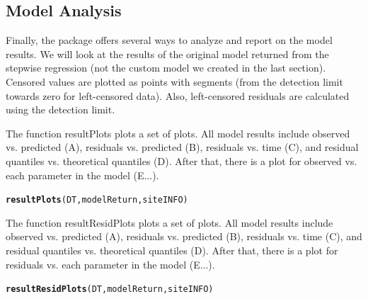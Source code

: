 \documentclass[a4paper,11pt]{article}\usepackage[]{graphicx}\usepackage[]{color}
\makeatletter
\newcommand{\hlkwd}[1]{\textcolor[rgb]{0.737,0.353,0.396}{\textbf{#1}}}%
\newenvironment{kframe}{%
 \def\at@end@of@kframe{}%
 \ifinner\ifhmode%
  \def\at@end@of@kframe{\end{minipage}}%
  \begin{minipage}{\columnwidth}%
 \fi\fi%
 \def\FrameCommand##1{\hskip\@totalleftmargin \hskip-\fboxsep
 \colorbox{shadecolor}{##1}\hskip-\fboxsep
     \hskip-\linewidth \hskip-\@totalleftmargin \hskip\columnwidth}%
 \MakeFramed {\advance\hsize-\width
   \@totalleftmargin\z@ \linewidth\hsize
   \@setminipage}}%
 {\par\unskip\endMakeFramed%
 \at@end@of@kframe}
\newenvironment{knitrout}{}{} %
\makeatother
\begin{document}
\subsection{Model Analysis}
Finally, the package offers several ways to analyze and report on the model results. We will look at the results of the original model returned from the stepwise regression (not the custom model we created in the last section). Censored values are plotted as points with segments (from the detection limit towards zero for left-censored data). Also, left-censored residuals are calculated using the detection limit.

The function resultPlots plots a set of plots. All model results include observed vs. predicted (A), residuals vs. predicted (B), residuals vs. time (C), and residual quantiles vs. theoretical quantiles (D). After that, there is a plot for observed vs. each parameter in the model (E...).

\begin{knitrout}
\color{fgcolor}\begin{kframe}
\begin{alltt}
\hlkwd{resultPlots}(DT,modelReturn,siteINFO)
\end{alltt}


{\ttfamily\noindent\bfseries\color{errorcolor}{Error: object 'modelReturn' not found}}\end{kframe}
\end{knitrout}


\FloatBarrier

The function resultResidPlots plots a set of plots. All model results include observed vs. predicted (A), residuals vs. predicted (B), residuals vs. time (C), and residual quantiles vs. theoretical quantiles (D). After that, there is a plot for residuals vs. each parameter in the model (E...).


\begin{knitrout}
\color{fgcolor}\begin{kframe}
\begin{alltt}
\hlkwd{resultResidPlots}(DT,modelReturn,siteINFO)
\end{alltt}


{\ttfamily\noindent\bfseries\color{errorcolor}{Error: object 'modelReturn' not found}}\end{kframe}
\end{knitrout}
\end{document}
